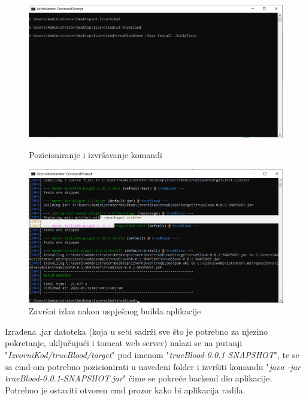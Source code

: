 			\begin{figure}[!tbp]
				\centering
				\begin{minipage}[b]{0.4\textwidth}
					\includegraphics[width=\textwidth]{slike/CmdCommands}
					\caption{Pozicioniranje i izvršavanje komandi}
					\label{fig:CmdCommands}
				\end{minipage}
				\hfill
				\begin{minipage}[b]{0.4\textwidth}
					\includegraphics[width=\textwidth]{slike/cmdBuildFinished}
					\caption{Završni izlaz nakon uspješnog builda aplikacije}
					\label{fig:cmdBuildFinished}
				\end{minipage}
			\end{figure}

			Izrađena .jar datoteka (koja u sebi sadrži sve što je potrebno za njezino pokretanje, uključujući i tomcat web server) nalazi se na putanji "\textit{IzvorniKod/trueBlood/target}" pod imenom "\textit{trueBlood-0.0.1-SNAPSHOT}", te se sa cmd-om potrebno pozicionirati u navedeni folder i izvršiti komandu "\textit{java -jar trueBlood-0.0.1-SNAPSHOT.jar}" čime se pokreće backend dio aplikacije. Potrebno je ostaviti otvoren cmd prozor kako bi aplikacija radila.\\
			

